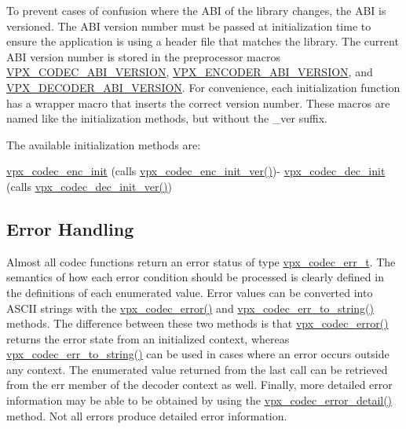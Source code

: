 \-To prevent cases of confusion where the \-A\-B\-I of the library changes, the \-A\-B\-I is versioned. \-The \-A\-B\-I version number must be passed at initialization time to ensure the application is using a header file that matches the library. \-The current \-A\-B\-I version number is stored in the preprocessor macros \hyperlink{group__codec_gaf7e9cad2df0f81679b881f46740ad097}{\-V\-P\-X\-\_\-\-C\-O\-D\-E\-C\-\_\-\-A\-B\-I\-\_\-\-V\-E\-R\-S\-I\-O\-N}, \hyperlink{group__encoder_gaa4f0b52293c08ba672429c3a03648b9d}{\-V\-P\-X\-\_\-\-E\-N\-C\-O\-D\-E\-R\-\_\-\-A\-B\-I\-\_\-\-V\-E\-R\-S\-I\-O\-N}, and \hyperlink{group__decoder_ga462b459e7ae13937e1eae1776245db12}{\-V\-P\-X\-\_\-\-D\-E\-C\-O\-D\-E\-R\-\_\-\-A\-B\-I\-\_\-\-V\-E\-R\-S\-I\-O\-N}. \-For convenience, each initialization function has a wrapper macro that inserts the correct version number. \-These macros are named like the initialization methods, but without the \-\_\-ver suffix.

\-The available initialization methods are\-:
\begin{DoxyItemize}
\item \hyperlink{group__encoder_ga3d490a2a9a6acd7c9ef82a603155f3cf}{vpx\-\_\-codec\-\_\-enc\-\_\-init} (calls \hyperlink{group__encoder_ga6ed21b96c481c0b6e1b543ef958a57a4}{vpx\-\_\-codec\-\_\-enc\-\_\-init\-\_\-ver()})-\/ \hyperlink{group__decoder_ga8c2f0b12f1bd4927eb3c68b01eab19d3}{vpx\-\_\-codec\-\_\-dec\-\_\-init} (calls \hyperlink{group__decoder_ga26fe82cf8fd697f885935cea53be964f}{vpx\-\_\-codec\-\_\-dec\-\_\-init\-\_\-ver()})
\end{DoxyItemize}\hypertarget{usage_usage_errors}{}\subsection{\-Error Handling}\label{usage_usage_errors}
\-Almost all codec functions return an error status of type \hyperlink{group__codec_gada1084710837ad363b92f2379dd2b8d2}{vpx\-\_\-codec\-\_\-err\-\_\-t}. \-The semantics of how each error condition should be processed is clearly defined in the definitions of each enumerated value. \-Error values can be converted into \-A\-S\-C\-I\-I strings with the \hyperlink{group__codec_ga4d265df00d42b36a4f0e3eb83fc22c5e}{vpx\-\_\-codec\-\_\-error()} and \hyperlink{group__codec_gaaddf5c1f609ef18c7c8800d102fcefa6}{vpx\-\_\-codec\-\_\-err\-\_\-to\-\_\-string()} methods. \-The difference between these two methods is that \hyperlink{group__codec_ga4d265df00d42b36a4f0e3eb83fc22c5e}{vpx\-\_\-codec\-\_\-error()} returns the error state from an initialized context, whereas \hyperlink{group__codec_gaaddf5c1f609ef18c7c8800d102fcefa6}{vpx\-\_\-codec\-\_\-err\-\_\-to\-\_\-string()} can be used in cases where an error occurs outside any context. \-The enumerated value returned from the last call can be retrieved from the {\ttfamily err} member of the decoder context as well. \-Finally, more detailed error information may be able to be obtained by using the \hyperlink{group__codec_ga29273cb552ed1a437fe263c4a0a54300}{vpx\-\_\-codec\-\_\-error\-\_\-detail()} method. \-Not all errors produce detailed error information.

